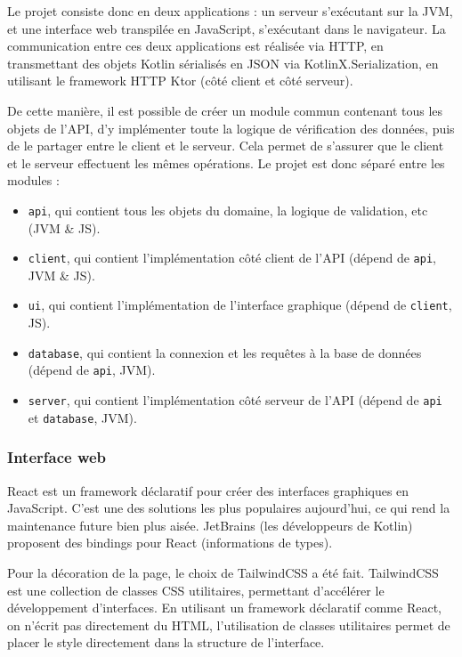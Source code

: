 \documentclass[11pt,french]{memoir}
\begin{document}
	\uparagraph
	Le projet consiste donc en deux applications : un serveur s’exécutant sur la JVM, et une interface web transpilée en JavaScript, s’exécutant dans le navigateur.
	La communication entre ces deux applications est réalisée via HTTP, en transmettant des objets Kotlin sérialisés en JSON via KotlinX.Serialization, en utilisant le framework HTTP Ktor (côté client et côté serveur).

	De cette manière, il est possible de créer un module commun contenant tous les objets de l’API, d’y implémenter toute la logique de vérification des données, puis de le partager entre le client et le serveur.
	Cela permet de s’assurer que le client et le serveur effectuent les mêmes
	opérations.
	Le projet est donc séparé entre les modules :
	\begin{itemize}
		\item \lstinline{api}, qui contient tous les objets du domaine, la logique de validation, etc (JVM \& JS).
		\item \lstinline{client}, qui contient l’implémentation côté client de l’API (dépend de \lstinline{api}, JVM \& JS).
		\item \lstinline{ui}, qui contient l’implémentation de l’interface graphique (dépend de \lstinline{client}, JS).
		\item \lstinline{database}, qui contient la connexion et les requêtes à la base de données (dépend de \lstinline{api}, JVM).
		\item \lstinline{server}, qui contient l’implémentation côté serveur de l’API (dépend de \lstinline{api} et \lstinline{database}, JVM).
	\end{itemize}

	\subsubsection{Interface web}

	React est un framework déclaratif pour créer des interfaces graphiques en JavaScript.
	C’est une des solutions les plus populaires aujourd’hui, ce qui rend la maintenance future bien plus aisée.
	JetBrains (les développeurs de Kotlin) proposent des bindings pour React (informations de types).

	Pour la décoration de la page, le choix de TailwindCSS a été fait.
	TailwindCSS est une collection de classes CSS utilitaires, permettant d’accélérer le développement d’interfaces.
	En utilisant un framework déclaratif comme React, on n’écrit pas directement du HTML, l’utilisation de classes utilitaires permet de placer le style directement dans la structure de l’interface.
\end{document}
